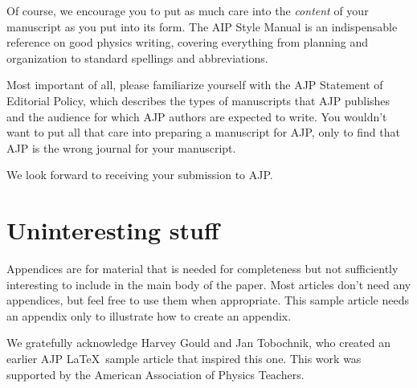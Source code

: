 \documentclass[prb,preprint]{revtex4-1}
\begin{document}
Of course, we encourage you to put as much care into the \textit{content} 
of your manuscript as you put into its form.  The AIP Style 
Manual\cite{AIPstylemanual} is an indispensable reference on good physics 
writing, covering everything from planning and organization to standard 
spellings and abbreviations.

Most important of all, please familiarize yourself with the AJP Statement
of Editorial Policy,\cite{editorsite} which describes the types of manuscripts 
that AJP publishes and the audience for which AJP authors are expected to write.
You wouldn't want to put all that care into preparing a manuscript for AJP,
only to find that AJP is the wrong journal for your manuscript.

We look forward to receiving your submission to AJP.


\appendix*   %

\section{Uninteresting stuff}

Appendices are for material that is needed for completeness but
not sufficiently interesting to include in the main body of the paper.  Most
articles don't need any appendices, but feel free to use them when
appropriate.  This sample article needs an appendix only to illustrate how 
to create an appendix.


\begin{acknowledgments}

We gratefully acknowledge Harvey Gould and Jan Tobochnik, who created an earlier 
AJP \LaTeX\ sample article that inspired this one.  This work was supported by the 
American Association of Physics Teachers.

\end{acknowledgments}
\end{document}
